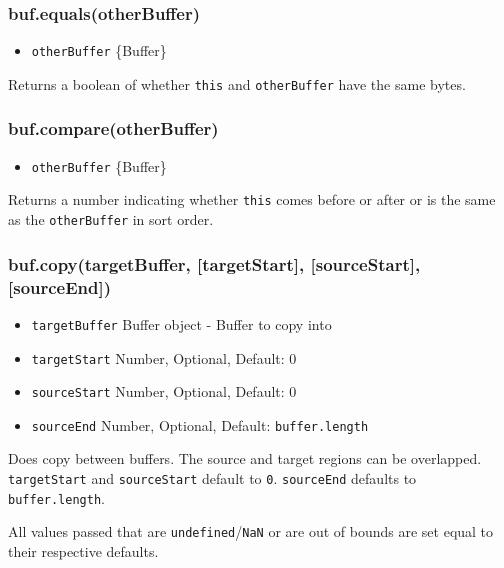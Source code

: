 \subsubsection{buf.equals(otherBuffer)}\label{buf.equalsotherbuffer}

\begin{itemize}
\itemsep1pt\parskip0pt
\item
  \texttt{otherBuffer} \{Buffer\}
\end{itemize}

Returns a boolean of whether \texttt{this} and \texttt{otherBuffer} have
the same bytes.

\subsubsection{buf.compare(otherBuffer)}\label{buf.compareotherbuffer}

\begin{itemize}
\itemsep1pt\parskip0pt
\item
  \texttt{otherBuffer} \{Buffer\}
\end{itemize}

Returns a number indicating whether \texttt{this} comes before or after
or is the same as the \texttt{otherBuffer} in sort order.

\subsubsection{buf.copy(targetBuffer, {[}targetStart{]},
{[}sourceStart{]},
{[}sourceEnd{]})}\label{buf.copytargetbuffer-targetstart-sourcestart-sourceend}

\begin{itemize}
\itemsep1pt\parskip0pt
\item
  \texttt{targetBuffer} Buffer object - Buffer to copy into
\item
  \texttt{targetStart} Number, Optional, Default: 0
\item
  \texttt{sourceStart} Number, Optional, Default: 0
\item
  \texttt{sourceEnd} Number, Optional, Default: \texttt{buffer.length}
\end{itemize}

Does copy between buffers. The source and target regions can be
overlapped. \texttt{targetStart} and \texttt{sourceStart} default to
\texttt{0}. \texttt{sourceEnd} defaults to \texttt{buffer.length}.

All values passed that are \texttt{undefined}/\texttt{NaN} or are out of
bounds are set equal to their respective defaults.


